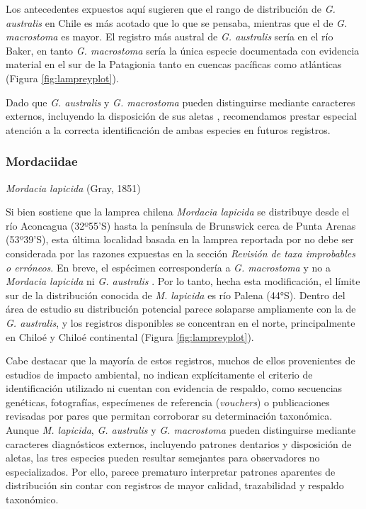 \documentclass[sn-apa,pdflatex]{sn-jnl}
\begin{document}
Los antecedentes expuestos aquí sugieren que el rango de distribución de
\emph{G. australis} en Chile es más acotado que lo que se pensaba,
mientras que el de \emph{G. macrostoma} es mayor. El registro más
austral de \emph{G. australis} sería en el río Baker, en tanto \emph{G.
macrostoma} sería la única especie documentada con evidencia material en
el sur de la Patagionia tanto en cuencas pacíficas como atlánticas
(Figura \ref{fig:lampreyplot}).

Dado que \emph{G. australis} y \emph{G. macrostoma} pueden distinguirse
mediante caracteres externos, incluyendo la disposición de sus aletas
\citep{Riva-Rossi2020}, recomendamos prestar especial atención a la
correcta identificación de ambas especies en futuros registros.

\subsubsection{Mordaciidae}\label{mordaciidae}

\emph{Mordacia lapicida} (Gray, 1851)

Si bien \citet{Neira1984} sostiene que la lamprea chilena \emph{Mordacia
lapicida} se distribuye desde el río Aconcagua (32º55'S) hasta la
península de Brunswick cerca de Punta Arenas (53º39'S), esta última
localidad basada en la lamprea reportada por \citet{Sieldfeld1976} no
debe ser considerada por las razones expuestas en la sección
\emph{Revisión de taxa improbables o erróneos}. En breve, el espécimen
correspondería a \emph{G. macrostoma} y no a \emph{Mordacia lapicida} ni
\emph{G. australis} \citep{Riva-Rossi2020}. Por lo tanto, hecha esta
modificación, el límite sur de la distribución conocida de \emph{M.
lapicida} es río Palena (44°S). Dentro del área de estudio su
distribución potencial parece solaparse ampliamente con la de \emph{G.
australis}, y los registros disponibles se concentran en el norte,
principalmente en Chiloé y Chiloé continental (Figura
\ref{fig:lampreyplot}).

Cabe destacar que la mayoría de estos registros, muchos de ellos
provenientes de estudios de impacto ambiental, no indican explícitamente
el criterio de identificación utilizado ni cuentan con evidencia de
respaldo, como secuencias genéticas, fotografías, especímenes de
referencia (\emph{vouchers}) o publicaciones revisadas por pares que
permitan corroborar su determinación taxonómica. Aunque \emph{M.
lapicida}, \emph{G. australis} y \emph{G. macrostoma} pueden
distinguirse mediante caracteres diagnósticos externos, incluyendo
patrones dentarios y disposición de aletas, las tres especies pueden
resultar semejantes para observadores no especializados. Por ello,
parece prematuro interpretar patrones aparentes de distribución sin
contar con registros de mayor calidad, trazabilidad y respaldo
taxonómico.
\end{document}
